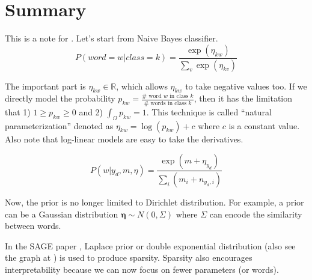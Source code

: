 \documentclass[11pt]{article}
\begin{document}
\section{Summary}

This is a note for \cite{eisenstein2011sparse}.
Let's start from Naive Bayes classifier.
$$
P(word = w|class = k) = \frac{\exp(\eta_{kw})}{\sum_v \exp(\eta_{kv})}
$$

The important part is $\eta_{kw} \in \mathbb{R}$, which allows $\eta_{kw}$ to take negative values too. If we directly model the probability $p_{kw} = \frac{\# \text{ word $w$ in class } k}{\# \text{ words in class } k}$, then it has the limitation that 1) $1 \geq p_{kw} \geq 0$ and 2) $\int_{\Omega} p_{kw} = 1$. This technique is called ``natural parameterization'' denoted as $\eta_{kw} = \log(p_{kw}) + c$ where $c$ is a constant value.
Also note that log-linear models are easy to take the derivatives.



$$
P(w|y_d, m, \eta) = \frac{\exp(m + \eta_{y_d})}{\sum_i (m_i + n_{y_d, i})}
$$

Now, the prior is no longer limited to Dirichlet distribution. For example, a prior can be a Gaussian distribution $\bm{\eta} \sim N(0, \Sigma)$ where $\Sigma$ can encode the similarity between words.

In the SAGE paper \cite{eisenstein2011sparse}, Laplace prior or double exponential distribution (also see the graph at \cite{laplace_prior}) is used to produce sparsity. 
Sparsity also encourages interpretability because we can now focus on fewer parameters (or words).



\end{document}

